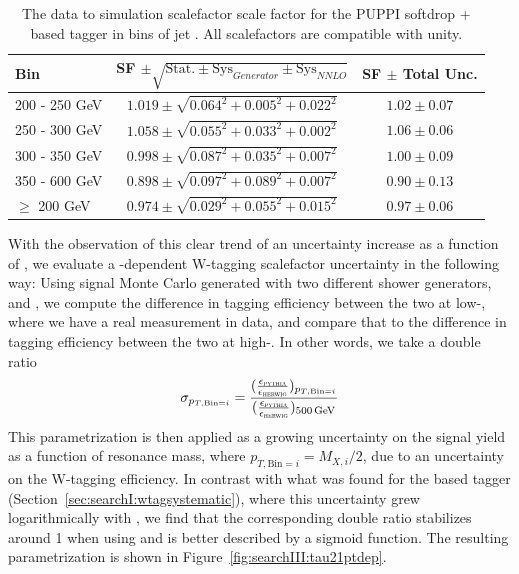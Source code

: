 \begin{table}[h!]
    \centering
    \begin{tabular}{|l|c|c|}
    \hline
     Bin & SF $\pm \sqrt{\textrm{Stat.} \pm \textrm{Sys}_{Generator} \pm \textrm{Sys}_{NNLO}}$ & SF $\pm$ Total Unc. \\
\hline
200 - 250 GeV  & $1.019  \pm \sqrt{ 0.064^2 + 0.005^2 + 0.022^2 }$ & $1.02 \pm 0.07$\\
250 - 300 GeV  & $1.058  \pm \sqrt{ 0.055^2 + 0.033^2 + 0.002^2 }$ & $1.06 \pm 0.06$\\
300 - 350 GeV  & $0.998  \pm \sqrt{ 0.087^2 + 0.035^2 + 0.007^2 }$ & $1.00 \pm 0.09$\\
350 - 600 GeV  & $0.898  \pm \sqrt{ 0.097^2 + 0.089^2 + 0.007^2 }$ & $0.90 \pm 0.13$\\
\hline
$\geq$ 200 GeV & $0.974  \pm \sqrt{ 0.029^2 + 0.055^2 + 0.015^2 }$ & $0.97 \pm 0.06$\\
    \hline
    \end{tabular}
    \caption{The data to simulation scalefactor scale factor for the PUPPI softdrop + \nsubj based tagger in bins of jet \PT. All scalefactors are compatible with unity.}
    \label{tab:searchIII:sfptdep}
 \end{table}
With the observation of this clear trend of an uncertainty increase as a function of \PT, we evaluate a \PT-dependent W-tagging scalefactor uncertainty in the following way: Using signal Monte Carlo generated with two different shower generators,  and \HERWIG{++}, we compute the difference in tagging efficiency between the two at low-\PT, where we have a real measurement in data, and compare that to the difference in tagging efficiency between the two at high-\PT. In other words, we take a double ratio 
\begin{equation}
  \sigma_{p_{T,\textrm{Bin}=i}}=\frac{ (\frac{\epsilon_{{\textsc{pythia}}}}{\epsilon_{{\textsc{herwig}}}})_{p_{T,\textrm{Bin}=i}}} {(\frac{\epsilon_{{\textsc{pythia}}}}{\epsilon_{{\textsc{herwig}}}})_{500 \,\text{Ge\hspace{-.08em}V}}}
  \end{equation}
This parametrization is then applied as a growing uncertainty on the signal yield as a function of resonance mass, where $p_{T,\textrm{Bin}=i}=M_{X,i}/2$, due to an uncertainty on the W-tagging efficiency. In contrast with what was found for the \nsubj based tagger (Section~\ref{sec:searchI:wtagsystematic}), where this uncertainty grew logarithmically with \PT, we find that the corresponding double ratio stabilizes around 1 \TeV when using \ddt and is better described by a sigmoid function. The resulting parametrization is shown in Figure~\ref{fig:searchIII:tau21ptdep}.
